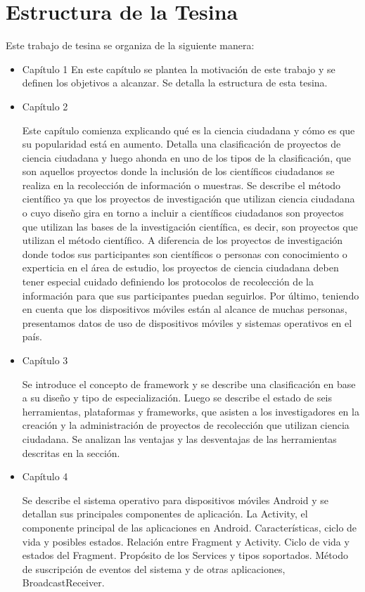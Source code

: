 \section{ Estructura de la Tesina }
Este trabajo de tesina se organiza de la siguiente manera:
\begin{itemize} 
	\item{Capítulo 1} 
		 En este capítulo se plantea la motivación de este trabajo y se definen los objetivos a alcanzar. Se detalla la estructura de esta tesina.

	\item{Capítulo 2} 
		
		Este capítulo comienza explicando qué es la ciencia ciudadana y cómo es que su popularidad está en aumento. Detalla una clasificación de proyectos de ciencia ciudadana y luego ahonda en uno de los tipos de la clasificación, que son aquellos proyectos donde la inclusión de los científicos ciudadanos se realiza en la recolección de información o muestras. Se describe el método científico ya que los proyectos de investigación que utilizan ciencia ciudadana o cuyo diseño gira en torno a incluir a científicos ciudadanos son proyectos que utilizan las bases de la investigación científica, es decir, son proyectos que utilizan el método científico. A diferencia de los proyectos de investigación donde todos sus participantes son científicos o personas con conocimiento o experticia en el área de estudio, los proyectos de ciencia ciudadana deben tener especial cuidado definiendo los protocolos de recolección de la información para que sus participantes puedan seguirlos. Por último, teniendo en cuenta que los dispositivos móviles están al alcance de muchas personas, presentamos datos de uso de dispositivos móviles y sistemas operativos en el país.
		
	
	\item{Capítulo 3} 
		
		Se introduce el concepto de framework y se describe una clasificación en base a su diseño y tipo de especialización. Luego se describe el estado de seis herramientas, plataformas y frameworks, que asisten a los investigadores en la creación y la administración de proyectos de recolección que utilizan ciencia ciudadana. Se analizan las ventajas y las desventajas de las herramientas descritas en la sección.
		
	
	\item{Capítulo 4} 
		
		Se describe el sistema operativo para dispositivos móviles Android y se detallan sus principales componentes de aplicación. La Activity, el componente principal de las aplicaciones en Android. Características, ciclo de vida y posibles estados. Relación entre Fragment y Activity. Ciclo de vida y estados del Fragment. Propósito de los Services y tipos soportados. Método de suscripción de eventos del sistema y de otras aplicaciones, BroadcastReceiver. 
		 


\end{itemize}
